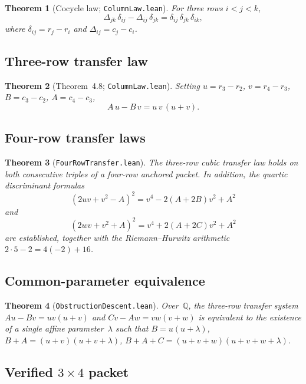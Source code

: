 \documentclass[11pt,a4paper]{article}
\newtheorem{theorem}{Theorem}[section]
\theoremstyle{definition}
\theoremstyle{remark}
\newcommand{\QQ}{\mathbb{Q}}
\begin{document}
\begin{theorem}[Cocycle law; \texttt{ColumnLaw.lean}]
For three rows $i<j<k$,
\[
  \Delta_{jk}\,\delta_{ij} - \Delta_{ij}\,\delta_{jk}
  = \delta_{ij}\,\delta_{jk}\,\delta_{ik},
\]
where $\delta_{ij}=r_j-r_i$ and $\Delta_{ij}=c_j-c_i$.
\end{theorem}

\subsection{Three-row transfer law}

\begin{theorem}[Theorem~4.8; \texttt{ColumnLaw.lean}]\label{thm:3row-transfer}
Setting $u=r_3-r_2$, $v=r_4-r_3$, $B=c_3-c_2$, $A=c_4-c_3$,
\[
  A\,u - B\,v = u\,v\,(u+v).
\]
\end{theorem}

\subsection{Four-row transfer laws}

\begin{theorem}[\texttt{FourRowTransfer.lean}]
The three-row cubic transfer law holds on both consecutive triples of a
four-row anchored packet.  In addition, the quartic discriminant formulas
\[
  (2uv+v^2-A)^2 = v^4 - 2(A+2B)v^2 + A^2
\]
and
\[
  (2wv+v^2+A)^2 = v^4 + 2(A+2C)v^2 + A^2
\]
are established, together with the Riemann--Hurwitz arithmetic
$2\cdot 5 - 2 = 4(-2)+16$.
\end{theorem}

\subsection{Common-parameter equivalence}

\begin{theorem}[\texttt{ObstructionDescent.lean}]\label{thm:common-param}
Over~$\QQ$, the three-row transfer system
$Au - Bv = uv(u+v)$ and $Cv - Aw = vw(v+w)$ is equivalent to the
existence of a single affine parameter~$\lambda$ such that
$B = u(u+\lambda)$, $B+A = (u+v)(u+v+\lambda)$,
$B+A+C = (u+v+w)(u+v+w+\lambda)$.
\end{theorem}

\subsection{Verified $3\times 4$ packet}
\end{document}
